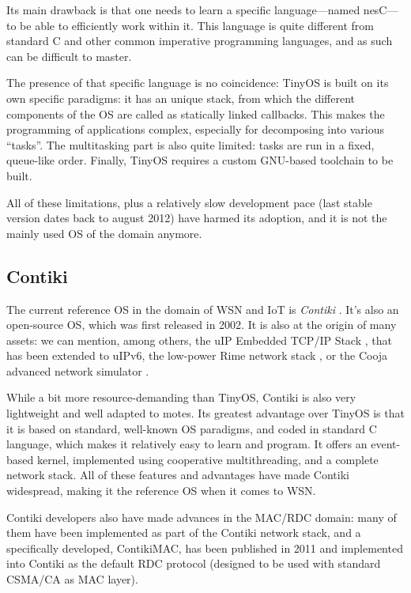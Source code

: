 \documentclass[a4paper,twoside]{article}
\begin{document}
Its main drawback is that one needs to learn a specific language---named
nesC---to be able to efficiently work within it. This language is quite
different from standard C and other common imperative programming languages,
and as such can be difficult to master.

The presence of that specific language is no coincidence: TinyOS is built
on its own specific paradigms: it has an unique stack, from which the
different components of the OS are called as statically linked callbacks.
This makes the programming of applications complex, especially for
decomposing into various ``tasks''. The multitasking part is also
quite limited: tasks are run in a fixed, queue-like order. Finally,
TinyOS requires a custom GNU-based toolchain to be built.

All of these limitations, plus a relatively slow development pace (last
stable version dates back to august 2012) have harmed its adoption,
and it is not the mainly used OS of the domain anymore.

\subsection{Contiki}

The current reference OS in the domain of WSN and IoT is \emph{Contiki}
\cite{ContikiOS}. It's also an open-source OS, which was first released
in 2002. It is also at the origin of many assets: we can mention, among
others, the uIP Embedded TCP/IP Stack \cite{uip}, that has been extended
to uIPv6, the low-power Rime network stack \cite{Rime}, or the Cooja advanced
network simulator \cite{Cooja}.

While a bit more resource-demanding than TinyOS, Contiki is also very
lightweight and well adapted to motes. Its greatest advantage over TinyOS
is that it is based on standard, well-known OS paradigms, and coded
in standard C language, which makes it relatively easy to learn and program.
It offers an event-based kernel, implemented using cooperative multithreading,
and a complete network stack. All of these features and advantages have made
Contiki widespread, making it the reference OS when it comes to WSN.

Contiki developers also have made advances in the MAC/RDC domain: many
of them have been implemented as part of the Contiki network stack, and
a specifically developed, ContikiMAC, has been published in 2011
\cite{ContikiMAC} and implemented into Contiki as the default
RDC protocol (designed to be used with standard CSMA/CA as MAC layer).
\end{document}
